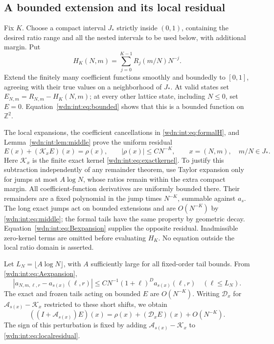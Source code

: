 \documentclass[11pt,letterpaper]{article}
\theoremstyle{remark}\newtheorem{remark}[theorem]{Remark}
\newcommand{\Z}{\mathbb Z}
\begin{document}
\subsection{A bounded extension and its local residual}
Fix $K$. Choose a compact interval $J_*$ strictly inside $(0,1)$,
containing the desired ratio range and all the nested intervals to be
used below, with additional margin. Put
\[
 H_K(N,m)=\sum_{j=0}^{K-1}R_j(m/N)N^{-j}.
\]
Extend the finitely many coefficient functions smoothly and boundedly
to $[0,1]$, agreeing with their true values on a neighborhood of $J_*$.
At valid states set $E_{N,m}=R_{N,m}-H_K(N,m)$; at every other lattice
state, including $N\le0$, set $E=0$. Equation~\eqref{wdn:int:eq:bounded} shows
that this is a bounded function on $\Z^2$.

The local expansions, the coefficient cancellations in
\eqref{wdn:int:eq:formalH}, and Lemma~\ref{wdn:int:lem:middle} prove the uniform residual
\begin{equation}\label{wdn:int:eq:localresidual}
 E(x)+(\mathcal K_xE)(x)=\rho(x),\qquad
 |\rho(x)|\le C N^{-K},\qquad x=(N,m),\quad m/N\in J_*.
\end{equation}
Here $\mathcal K_x$ is the finite exact kernel
\eqref{wdn:int:eq:exactkernel}. To justify this subtraction independently of any
remainder theorem, use Taylor expansion only for jumps at most
$A\log N$, whose ratios remain within the extra compact margin. All
coefficient-function derivatives are uniformly bounded there. Their
remainders are a fixed polynomial in the jump times $N^{-K}$, summable
against $a_s$. The long exact jumps act on bounded extensions and are
$O(N^{-K})$ by \eqref{wdn:int:eq:middle}; the formal tails have the same property
by geometric decay. Equation~\eqref{wdn:int:eq:Bexpansion} supplies the opposite
residual. Inadmissible zero-kernel terms are omitted before evaluating
$H_K$. No equation outside the local ratio domain is asserted.

Let $L_N=\lfloor A\log N\rfloor$, with $A$ sufficiently large for all
fixed-order tail bounds. From \eqref{wdn:int:eq:Aexpansion},
\begin{equation}\label{wdn:int:eq:perturbation}
 |a_{N,m,\ell,r}-a_{s(x)}(\ell,r)|
 \le C N^{-1}(1+\ell)^D a_{s(x)}(\ell,r)
 \quad(\ell\le L_N).
\end{equation}
The exact and frozen tails acting on bounded $E$ are $O(N^{-K})$.
Writing $\mathcal D_x$ for $\mathcal A_{s(x)}-\mathcal K_x$ restricted
to these short shifts, we obtain
\begin{equation}\label{wdn:int:eq:naturalfrozen}
 ((I+\mathcal A_{s(x)})E)(x)
   =\rho(x)+(\mathcal D_xE)(x)+O(N^{-K}).
\end{equation}
The sign of this perturbation is fixed by adding
$\mathcal A_{s(x)}-\mathcal K_x$ to \eqref{wdn:int:eq:localresidual}.
\end{document}
